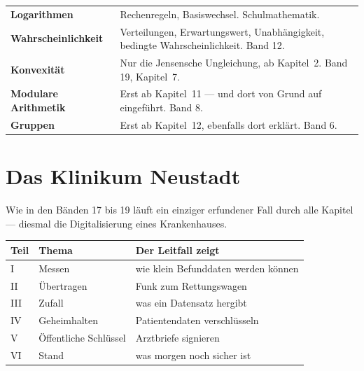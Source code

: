 \begin{merksatz}
\begin{center}
{\small
\renewcommand{\arraystretch}{1.5}
\begin{tabular}{@{}P{3.0cm}P{5.6cm}@{}}
\toprule
\textbf{Logarithmen} & Rechenregeln, Basiswechsel. Schulmathematik.\\
\textbf{Wahrschein\-lichkeit} & Verteilungen, Erwartungswert, Unabhängigkeit, bedingte Wahrscheinlichkeit. Band 12.\\
\textbf{Konvexität} & Nur die Jensensche Ungleichung, ab Kapitel~2. Band 19, Kapitel~7.\\
\textbf{Modulare Arithmetik} & Erst ab Kapitel~11 --- und dort von Grund auf eingeführt. Band 8.\\
\textbf{Gruppen} & Erst ab Kapitel~12, ebenfalls dort erklärt. Band 6.\\
\bottomrule
\end{tabular}}
\end{center}

\begin{center}
\begin{minipage}{0.88\textwidth}
\end{minipage}
\end{center}
\end{merksatz}

\section*{Das Klinikum Neustadt}

\begin{merksatz}
Wie in den Bänden 17 bis 19 läuft ein einziger erfundener Fall durch alle Kapitel --- diesmal die Digitalisierung eines Krankenhauses.

\begin{center}
{\small
\renewcommand{\arraystretch}{1.5}
\begin{tabular}{@{}P{1.6cm}P{2.6cm}P{3.8cm}@{}}
\toprule
\textbf{Teil} & \textbf{Thema} & \textbf{Der Leitfall zeigt}\\
\midrule
I & Messen & wie klein Befunddaten werden können\\
II & Übertragen & Funk zum Rettungswagen\\
III & Zufall & was ein Datensatz hergibt\\
IV & Geheimhalten & Patientendaten verschlüsseln\\
V & Öffentliche Schlüssel & Arztbriefe signieren\\
VI & Stand & was morgen noch sicher ist\\
\bottomrule
\end{tabular}}
\end{center}
\end{merksatz}

